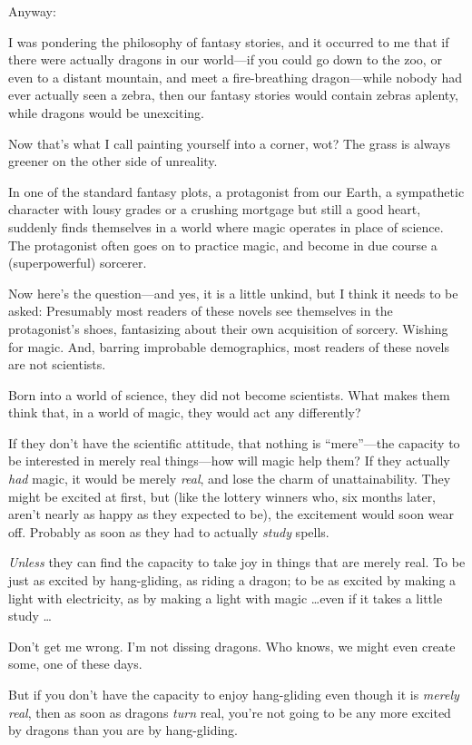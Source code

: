 {
 Anyway:}

{
 I was pondering the philosophy of fantasy stories, and it occurred
to me that if there were actually dragons in our world---if you could
go down to the zoo, or even to a distant mountain, and meet a
fire-breathing dragon---while nobody had ever actually seen a zebra,
then our fantasy stories would contain zebras aplenty, while dragons
would be unexciting.}

{
 Now that's what I call painting yourself into a
corner, wot? The grass is always greener on the other side of
unreality.}

{
 In one of the standard fantasy plots, a protagonist from our
Earth, a sympathetic character with lousy grades or a crushing mortgage
but still a good heart, suddenly finds themselves in a world where
magic operates in place of science. The protagonist often goes on to
practice magic, and become in due course a (superpowerful) sorcerer.}

{
 Now here's the question---and yes, it is a little
unkind, but I think it needs to be asked: Presumably most readers of
these novels see themselves in the protagonist's shoes,
fantasizing about their own acquisition of sorcery. Wishing for magic.
And, barring improbable demographics, most readers of these novels are
not scientists.}

{
 Born into a world of science, they did not become scientists. What
makes them think that, in a world of magic, they would act any
differently?}

{
 If they don't have the scientific attitude, that
nothing is ``mere''---the capacity
to be interested in merely real things---how will magic help them? If
they actually \textit{had} magic, it would be merely \textit{real}, and
lose the charm of unattainability. They might be excited at first, but
(like the lottery winners who, six months later, aren't
nearly as happy as they expected to be), the excitement would soon wear
off. Probably as soon as they had to actually \textit{study} spells.}

{
 \textit{Unless} they can find the capacity to take joy in things
that are merely real. To be just as excited by hang-gliding, as riding
a dragon; to be as excited by making a light with electricity, as by
making a light with magic \ldots even if it takes a little study \ldots}

{
 Don't get me wrong. I'm not
dissing dragons. Who knows, we might even create some, one of these
days.}

{
 But if you don't have the capacity to enjoy
hang-gliding even though it is \textit{merely real}, then as soon as
dragons \textit{turn} real, you're not going to be any
more excited by dragons than you are by hang-gliding.}

